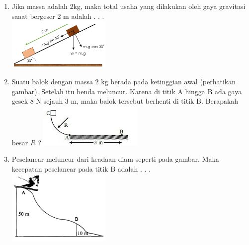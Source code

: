 \documentclass[10pt,a4paper]{extarticle}
\begin{document}
\begin{multicols*}{2}
\begin{enumerate}
\item Jika massa adalah 2kg, maka total usaha yang dilakukan oleh gaya gravitasi saaat bergeser 2 m adalah . . . \\
\includegraphics[width=5cm]{pic/latul-usaha3} 
\vspace{2cm}

\item Suatu balok dengan massa 2 kg berada pada ketinggian awal (perhatikan gambar). Setelah itu benda meluncur. Karena di titik A hingga B ada gaya gesek 8 N sejauh 3 m, maka balok tersebut berhenti di titik B. Berapakah besar $R$ ?
\includegraphics[width=5cm]{pic/latul-usaha2}
\vspace{3cm}

\item Peselancar meluncur dari keadaan diam seperti pada gambar. Maka kecepatan peselancar pada titik B adalah . . . \\
\includegraphics[width=5cm]{pic/latul-usaha1}

\end{enumerate}
\end{multicols*}
\end{document}
